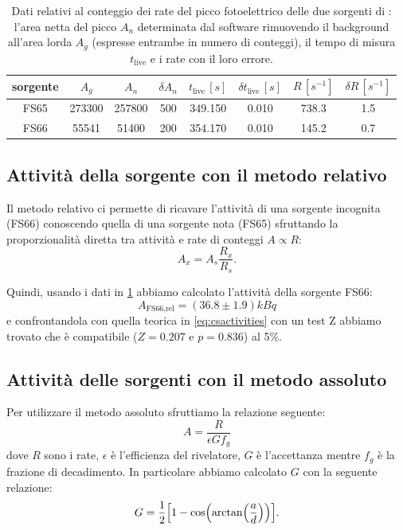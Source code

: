 \begin{table}
	\centering
	\begin{tabular}{c|ccc|cc|cc}
		sorgente & $A_g$ & $A_n$ & $ \delta A_n $ & $t_\text{live} \, [\unit{s}]$ & $\delta t_\text{live} \, [\unit{s}]$ & $R \, [\unit{s^{-1}}]$ & $\delta R \, [\unit{s^{-1}}]$ \\
		\hline
		FS65 & 273300 & 257800 & 500 & 349.150 & 0.010 & 738.3 & 1.5 \\ 
		FS66 & 55541 & 51400 & 200  & 354.170 & 0.010  & 145.2 & 0.7 
	\end{tabular}
	\caption{Dati relativi al conteggio dei rate del picco fotoelettrico delle due sorgenti di : l'area netta del picco $A_n$ determinata dal software rimuovendo il background all'area lorda $A_g$ (espresse entrambe in numero di conteggi), il tempo di misura $t_\text{live}$ e i rate con il loro errore.}
	\label{tab:csrates}
\end{table}

\subsection{Attività della sorgente con il metodo relativo}

Il metodo relativo ci permette di ricavare l'attività di una sorgente incognita (FS66) conoscendo quella di una sorgente nota (FS65) sfruttando la proporzionalità diretta tra attività e rate di conteggi $ A \propto R $:
\begin{equation}
A_x = A_s\frac{R_x}{R_s}.
\end{equation}	

Quindi, usando i dati in \cref{tab:csrates} abbiamo calcolato l'attività della sorgente FS66:
\begin{equation}
A_\text{FS66,rel} = (36.8 \pm 1.9) \unit{kBq} 
\end{equation}
e confrontandola con quella teorica in \cref{eq:csactivities} con un test Z abbiamo trovato che è compatibile ($ Z = 0.207 $ e $ p = 0.836 $) al 5\%.

\subsection{Attività delle sorgenti con il metodo assoluto}

Per utilizzare il metodo assoluto sfruttiamo la relazione seguente:
\begin{equation}\label{eq:absactivity}
	A = \frac{R}{\epsilon G f_g}
\end{equation}
dove $R$ sono i rate, $\epsilon$ è l'efficienza del rivelatore, $G$ è l'accettanza mentre $f_g$ è la frazione di decadimento.
In particolare abbiamo calcolato $G$ con la seguente relazione:
\begin{equation} \label{eq:acc}
G = \frac{1}{2}\qty[1-\cos(\arctan(\frac{a}{d}))].
\end{equation}


